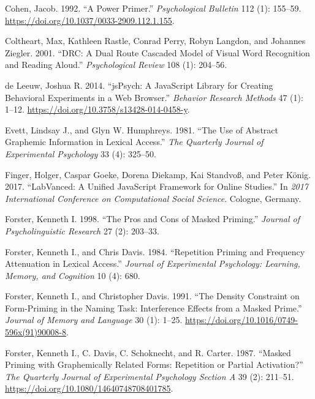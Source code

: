 \documentclass[
]{interact}
\newlength{\cslhangindent}
\newenvironment{CSLReferences}[2] %
 {\begin{list}{}{%
  \setlength{\itemindent}{0pt}
  \setlength{\leftmargin}{0pt}
  \setlength{\parsep}{0pt}
  \ifodd #1
   \setlength{\leftmargin}{\cslhangindent}
   \setlength{\itemindent}{-1\cslhangindent}
  \fi
  \setlength{\itemsep}{#2\baselineskip}}}
 {\end{list}}
\begin{document}
\begin{CSLReferences}{1}{0}
Cohen, Jacob. 1992. {``A Power Primer.''} \emph{Psychological Bulletin}
112 (1): 155--59. \url{https://doi.org/10.1037/0033-2909.112.1.155}.

Coltheart, Max, Kathleen Rastle, Conrad Perry, Robyn Langdon, and
Johannes Ziegler. 2001. {``DRC: A Dual Route Cascaded Model of Visual
Word Recognition and Reading Aloud.''} \emph{Psychological Review} 108
(1): 204--56.

de Leeuw, Joshua R. 2014. {``jsPsych: A JavaScript Library for Creating
Behavioral Experiments in a Web Browser.''} \emph{Behavior Research
Methods} 47 (1): 1--12. \url{https://doi.org/10.3758/s13428-014-0458-y}.

Evett, Lindsay J., and Glyn W. Humphreys. 1981. {``The Use of Abstract
Graphemic Information in Lexical Access.''} \emph{The Quarterly Journal
of Experimental Psychology} 33 (4): 325--50.

Finger, Holger, Caspar Goeke, Dorena Diekamp, Kai Standvoß, and Peter
König. 2017. {``LabVanced: A Unified JavaScript Framework for Online
Studies.''} In \emph{2017 International Conference on Computational
Social Science}. Cologne, Germany.

Forster, Kenneth I. 1998. {``The Pros and Cons of Masked Priming.''}
\emph{Journal of Psycholinguistic Research} 27 (2): 203--33.

Forster, Kenneth I., and Chris Davis. 1984. {``Repetition Priming and
Frequency Attenuation in Lexical Access.''} \emph{Journal of
Experimental Psychology: Learning, Memory, and Cognition} 10 (4): 680.

Forster, Kenneth I., and Christopher Davis. 1991. {``The Density
Constraint on Form-Priming in the Naming Task: Interference Effects from
a Masked Prime.''} \emph{Journal of Memory and Language} 30 (1): 1--25.
\url{https://doi.org/10.1016/0749-596x(91)90008-8}.

Forster, Kenneth I., C. Davis, C. Schoknecht, and R. Carter. 1987.
{``Masked Priming with Graphemically Related Forms: Repetition or
Partial Activation?''} \emph{The Quarterly Journal of Experimental
Psychology Section A} 39 (2): 211--51.
\url{https://doi.org/10.1080/14640748708401785}.


\end{CSLReferences}
\end{document}
